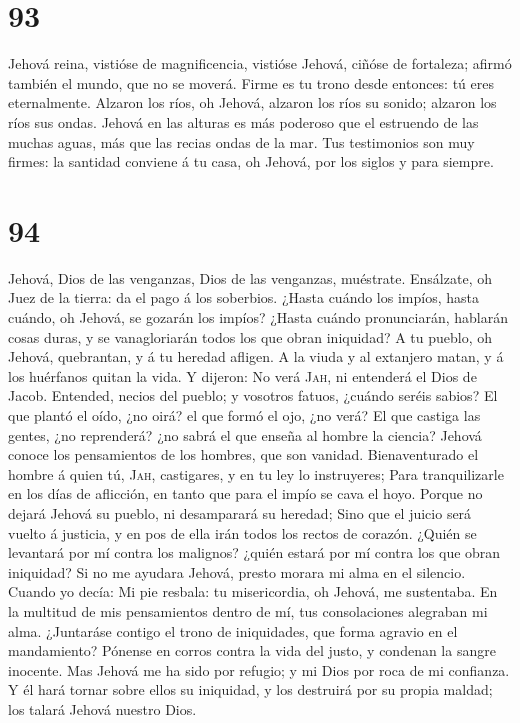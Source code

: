\hypertarget{section-92}{%
\section{93}\label{section-92}}

 Jehová reina, vistióse de magnificencia, vistióse Jehová,
ciñóse de fortaleza; afirmó también el mundo, que no se moverá.
 Firme es tu trono desde entonces: tú eres eternalmente.
 Alzaron los ríos, oh Jehová, alzaron los ríos su sonido;
alzaron los ríos sus ondas.  Jehová en las alturas es más
poderoso que el estruendo de las muchas aguas, más que las recias ondas
de la mar.  Tus testimonios son muy firmes: la santidad
conviene á tu casa, oh Jehová, por los siglos y para siempre.

\hypertarget{section-93}{%
\section{94}\label{section-93}}

 Jehová, Dios de las venganzas, Dios de las venganzas,
muéstrate.  Ensálzate, oh Juez de la tierra: da el pago á
los soberbios.  ¿Hasta cuándo los impíos, hasta cuándo, oh
Jehová, se gozarán los impíos?  ¿Hasta cuándo
pronunciarán, hablarán cosas duras, y se vanagloriarán todos los que
obran iniquidad?  A tu pueblo, oh Jehová, quebrantan, y á
tu heredad afligen.  A la viuda y al extanjero matan, y á
los huérfanos quitan la vida.  Y dijeron: No verá
\textsc{Jah}, ni entenderá el Dios de Jacob.  Entended,
necios del pueblo; y vosotros fatuos, ¿cuándo seréis sabios?
 El que plantó el oído, ¿no oirá? el que formó el ojo, ¿no
verá?  El que castiga las gentes, ¿no reprenderá? ¿no
sabrá el que enseña al hombre la ciencia?  Jehová conoce
los pensamientos de los hombres, que son vanidad. 
Bienaventurado el hombre á quien tú, \textsc{Jah}, castigares, y en tu
ley lo instruyeres;  Para tranquilizarle en los días de
aflicción, en tanto que para el impío se cava el hoyo. 
Porque no dejará Jehová su pueblo, ni desamparará su heredad;
 Sino que el juicio será vuelto á justicia, y en pos de
ella irán todos los rectos de corazón.  ¿Quién se
levantará por mí contra los malignos? ¿quién estará por mí contra los
que obran iniquidad?  Si no me ayudara Jehová, presto
morara mi alma en el silencio.  Cuando yo decía: Mi pie
resbala: tu misericordia, oh Jehová, me sustentaba.  En
la multitud de mis pensamientos dentro de mí, tus consolaciones
alegraban mi alma.  ¿Juntaráse contigo el trono de
iniquidades, que forma agravio en el mandamiento? 
Pónense en corros contra la vida del justo, y condenan la sangre
inocente.  Mas Jehová me ha sido por refugio; y mi Dios
por roca de mi confianza.  Y él hará tornar sobre ellos
su iniquidad, y los destruirá por su propia maldad; los talará Jehová
nuestro Dios.

